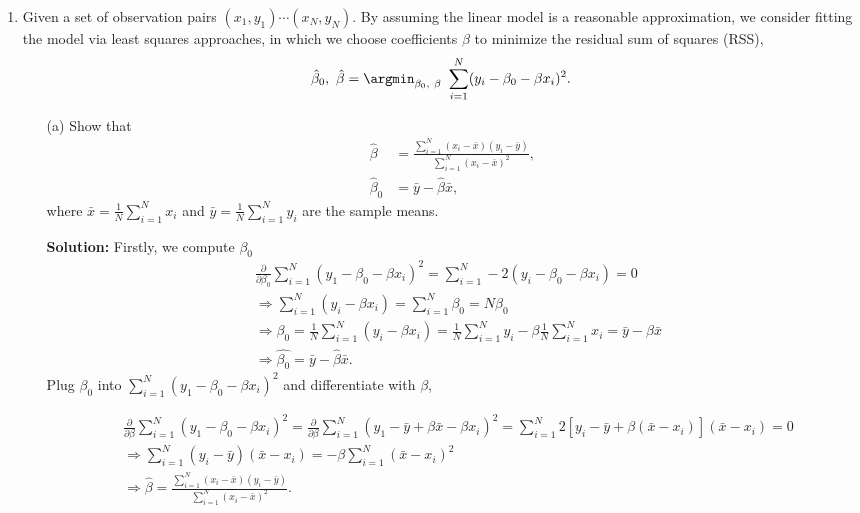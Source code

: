 \documentclass[10pt]{article}
\begin{document}
\begin{enumerate}[1.]
        \item  Given a set of observation pairs $(x_{1},y_{1})\cdots(x_{N},y_{N})$. By assuming the linear model is a reasonable approximation, we consider fitting the model via least squares approaches, in which we choose coefficients $\beta$ to minimize the residual sum of squares (RSS), 
        \begin{equation*}\label{eq:1}
        	\hat{\beta}_{0},~ \hat{\beta} = \argmin_{\beta_{0},~ \beta}~ \sum_{i=1}^{N}(y_{i} -\beta_{0}-\beta x_{i})^{2}.
        \end{equation*} 
        \begin{itemize}
			\item[(a)] Show that 
			\begin{equation}\label{eq:1-1}
			\begin{aligned}
			\hat{\beta} &= \tfrac{\sum_{i=1}^{N}(x_{i}-\bar{x})(y_{i}-\bar{y})}{\sum_{i=1}^{N}(x_{i}-\bar{x})^{2}},\\
			\hat{\beta}_{0} &= \bar{y} -\hat{\beta}\bar{x},
			\end{aligned}
			\end{equation}
			where $\bar{x} = \tfrac{1}{N}\sum_{i=1}^{N}x_{i}$ and $\bar{y} = \tfrac{1}{N}\sum_{i=1}^{N}y_{i}$ are the sample means.~
			
			
			\textbf{Solution:} Firstly, we compute $\beta_0$
			\begin{align*}
				&\frac{\partial}{\partial\beta_0}\sum\limits_{i=1}^{N}(y_1-\beta_0-\beta x_i)^2 = \sum\limits_{i=1}^{N}-2(y_i-\beta_0-\beta x_i)=0\\
				&\Rightarrow \sum\limits_{i=1}^{N}(y_i-\beta x_i) = \sum\limits_{i=1}^{N} \beta_0 = N\beta_0\\
				&\Rightarrow \beta_0 = \frac{1}{N} \sum\limits_{i=1}^{N}(y_i-\beta x_i) = \frac{1}{N}\sum\limits_{i=1}^{N}y_i-\beta\frac{1}{N}\sum\limits_{i=1}^{N}x_i=\bar{y}-\beta\bar{x}\\
				&\Rightarrow \hat{\beta_0} = \bar{y}-\hat{\beta}\bar{x}.
			\end{align*}
			Plug $\beta_0$ into $\sum\limits_{i=1}^{N}(y_1-\beta_0-\beta x_i)^2$ and differentiate with $\beta$,
		
		
		
			\begin{align*}
			&\frac{\partial}{\partial\beta}\sum\limits_{i=1}^{N}(y_1-\beta_0-\beta x_i)^2 = \frac{\partial}{\partial\beta}\sum\limits_{i=1}^{N}(y_1-\bar{y}+\beta\bar{x}-\beta x_i)^2=\sum\limits_{i=1}^{N}2[y_i-\bar{y}+\beta(\bar{x}-x_i)](\bar{x}-x_i)=0 \\
			&\Rightarrow \sum\limits_{i=1}^{N}(y_i-\bar{y})(\bar{x}-x_i)=-\beta\sum\limits_{i=1}^{N}(\bar{x}-x_i)^2\\
			&\Rightarrow \hat{\beta} = \frac{\sum\limits_{i=1}^{N}(x_i-\bar{x})(y_i-\bar{y})}{\sum\limits_{i=1}^{N}(x_i-\bar{x})^2}.
			\end{align*}
			

\end{itemize}
\end{enumerate}
\end{document}

